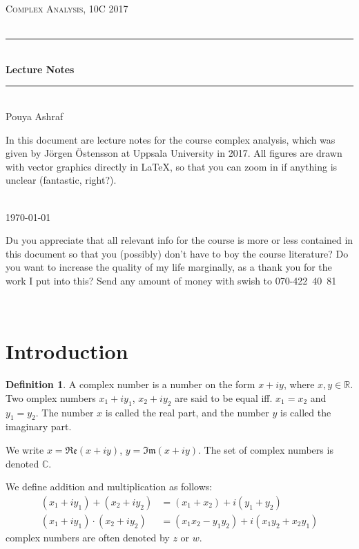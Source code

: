 \documentclass[12pt, a4paper]{article}
\theoremstyle{plain}
\theoremstyle{definition}
\newtheorem{definition}{Definition} %
\newcommand{\HRule}{\rule{\linewidth}{0.5mm}} %
\begin{document}
	\thispagestyle{empty}
	\begin{center}
		\textsc{\Large Complex Analysis, 10C 2017}\\[0.5cm] %
		\textsc{\large }\\[0.5cm] %
		
		\HRule \\[0.4cm]
		{ \huge \bfseries Lecture Notes}\\[0.2cm] %
		
		\HRule \\[1.5cm]
		\large Pouya Ashraf\\[3cm]%
		
		\parbox{12cm}{In this document are lecture notes for the course complex analysis, which was given by Jörgen Östensson at Uppsala University in 2017. All figures are drawn with vector graphics directly in \LaTeX, so that you can zoom in if anything is unclear (fantastic, right?).}\\[3cm]


		{\large \today} %

		\newpage
		\vspace*{\fill}
			\parbox{12cm}{Du you appreciate that all relevant info for the course is more or less contained in this document so that you (possibly) don't have to boy the course literature? Do you want to increase the quality of my life marginally, as a thank you for the work I put into this? Send any amount of money with swish to \mbox{070-422 40 81}}\\
		\vspace*{\fill}
	\end{center}
	\newpage

	\tableofcontents
	\newpage
	
	\section{Introduction} %
	\label{sec:introduction}
		\begin{definition}
			A complex number is a number on the form $x+iy$, where $x,y\in\mathbb{R}$. Two omplex numbers $x_1+iy_1$, $x_2+iy_2$ are said to be equal iff. $x_1=x_2$ and $y_1=y_2$. The number $x$ is called the real part, and the number $y$ is called the imaginary part.

			We write $x=\mathfrak{Re}(x+iy)$, $y=\mathfrak{Im}(x+iy)$. The set of complex numbers is denoted $\mathbb{C}$.

			We define addition and multiplication as follows:
			\begin{align*}
				(x_1+iy_1)+(x_2+iy_2) &= (x_1+x_2) + i(y_1+y_2)\\
				(x_1+iy_1)\cdot(x_2+iy_2) &= (x_1x_2-y_1y_2)+i(x_1y_2+x_2y_1)
			\end{align*}
			complex numbers are often denoted by $z$ or $w$.\\
		\end{definition}
\end{document}

